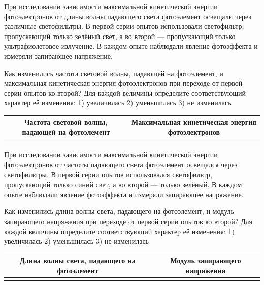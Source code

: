 \begin{taskbasic}[code={\label{task:photo_green_to_uv_freq_and_ek}}]
При исследовании зависимости максимальной кинетической энергии фотоэлектронов от длины волны падающего света фотоэлемент освещали через различные светофильтры. В первой серии опытов использовали светофильтр, пропускающий только зелёный свет, а во второй --- пропускающий только ультрафиолетовое излучение. В каждом опыте наблюдали явление фотоэффекта и измеряли запирающее напряжение.

Как изменились частота световой волны, падающей на фотоэлемент, и максимальная кинетическая энергия фотоэлектронов при переходе от первой серии опытов ко второй? Для каждой величины определите соответствующий характер её изменения:
1) увеличилась
2) уменьшилась
3) не изменилась

\nopagebreak\smallskip
\begin{center}
\small
\begin{tabular}{|c|c|}
\hline
Частота световой волны, падающей на фотоэлемент & Максимальная кинетическая энергия фотоэлектронов \\ \hline
 & \\ \hline
\end{tabular}
\end{center}

\end{taskbasic}

\begin{taskbasic}[code={\label{task:photo_blue_to_green_lambda_and_u}}]
При исследовании зависимости максимальной кинетической энергии фотоэлектронов от частоты падающего света фотоэлемент освещался через светофильтры. В первой серии опытов использовался светофильтр, пропускающий только синий свет, а во второй --- только зелёный. В каждом опыте наблюдали явление фотоэффекта и измеряли запирающее напряжение.

Как изменились длина волны света, падающего на фотоэлемент, и модуль запирающего напряжения при переходе от первой серии опытов ко второй? Для каждой величины определите соответствующий характер её изменения:
1) увеличилась
2) уменьшилась
3) не изменилась

\nopagebreak\smallskip
\begin{center}
\small
\begin{tabular}{|c|c|}
\hline
Длина волны света, падающего на фотоэлемент & Модуль запирающего напряжения \\ \hline
 & \\ \hline
\end{tabular}
\end{center}

\end{taskbasic}

